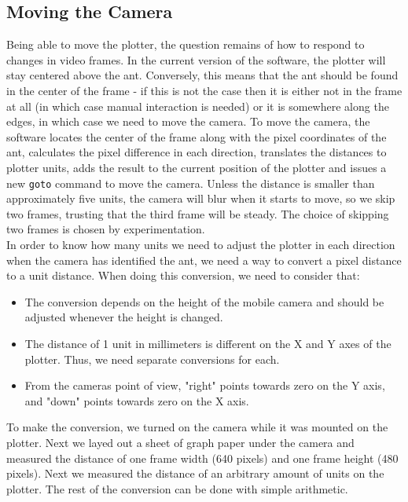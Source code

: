 \subsection{Moving the Camera}
Being able to move the plotter, the question remains of how to respond to changes in video frames. In the current version of the software, the plotter will stay centered above the ant. Conversely, this means that the ant should be found in the center of the frame - if this is not the case then it is either not in the frame at all (in which case manual interaction is needed) or it is somewhere along the edges, in which case we need to move the camera. To move the camera, the software locates the center of the frame along with the pixel coordinates of the ant, calculates the pixel difference in each direction, translates the distances to plotter units, adds the result to the current position of the plotter and issues a new \texttt{goto} command to move the camera. Unless the distance is smaller than approximately five units, the camera will blur when it starts to move, so we skip two frames, trusting that the third frame will be steady. The choice of skipping two frames is chosen by experimentation.\\

In order to know how many units we need to adjust the plotter in each direction when the camera has identified the ant, we need a way to convert a pixel distance to a unit distance. When doing this conversion, we need to consider that:

\begin{itemize}
  \item The conversion depends on the height of the mobile camera and should be adjusted whenever the height is changed.
  \item The distance of 1 unit in millimeters is different on the X and Y axes of the plotter. Thus, we need separate conversions for each.
  \item From the cameras point of view, "right" points towards zero on the Y axis, and "down" points towards zero on the X axis.
\end{itemize}

To make the conversion, we turned on the camera while it was mounted on the plotter. Next we layed out a sheet of graph paper under the camera and measured the distance of one frame width (640 pixels) and one frame height (480 pixels). Next we measured the distance of an arbitrary amount of units on the plotter. The rest of the conversion can be done with simple arithmetic. \\

